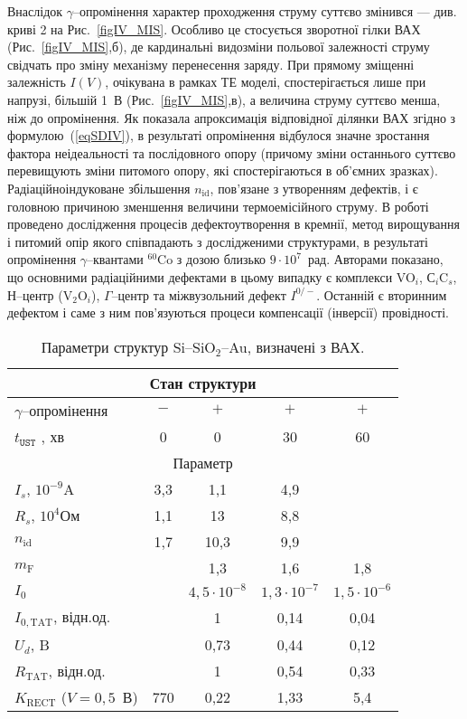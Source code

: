 Внаслідок $\gamma$--опромінення характер проходження струму суттєво змінився --- див. криві 2 на Рис.~\ref{figIV_MIS}.
Особливо це стосується зворотної гілки ВАХ (Рис.~\ref{figIV_MIS},б), де кардинальні видозміни польової залежності струму свідчать про зміну механізму перенесення заряду.
При прямому зміщенні залежність $I(V)$, очікувана в рамках ТЕ моделі, спостерігається лише при напрузі, більшій 1~В (Рис.~\ref{figIV_MIS},в), а величина струму суттєво менша, ніж до опромінення.
Як показала апроксимація відповідної ділянки ВАХ згідно з формулою~(\ref{eqSDIV}), в результаті опромінення відбулося значне  зростання фактора неідеальності та послідовного опору (причому зміни останнього суттєво перевищують зміни питомого опору, які спостерігаються в об'ємних зразках).
Радіаційноіндуковане збільшення $n_\mathrm{id}$, пов'язане з утворенням дефектів, і є головною причиною зменшення величини термоемісійного струму.
В роботі \cite{FZSi:Rad} проведено дослідження процесів дефектоутворення в кремнії, метод вирощування і питомий опір якого співпадають з дослідженими структурами, в результаті опромінення $\gamma$--квантами $^{60}$Co з дозою близько $9\cdot10^7$~рад.
Авторами  показано, що основними радіаційними дефектами в цьому випадку є комплекси VO$_i$, С$_i$C$_s$, $Н$--центр (V$_2$O$_i$), $\Gamma$--центр та міжвузольний дефект $I^{0/-}$.
Останній є вторинним дефектом і саме з ним пов'язуються процеси компенсації (інверсії) провідності.


\begin{table}
\caption{\label{tabMIS}Параметри структур Si--SiO$_2$--Au, визначені з ВАХ.
}
\center
\begin{tabular}{|l|c|c|c|c|}
\hline
\multicolumn{5}{|c|}{Стан структури}\\\hline
$\gamma$--опромінення&$-$&$+$&$+$&$+$\\ \hline
$t_\mathtt{UST}$ , хв&0&0&30&60\\ \hline
\multicolumn{5}{|c|}{Параметр}\\\hline
$I_s$, $10^{-9}$A & 3,3& 1,1& 4,9& \\ \hline
$R_s$, $10^{4}$Ом & 1,1& 13& 8,8& \\ \hline
$n_\mathrm{id}$ & 1,7& 10,3& 9,9& \\ \hline
$m_\mathrm{F}$ & &1,3& 1,6& 1,8 \\ \hline
$I_0$ & &$4,5\cdot10^{-8}$& $1,3\cdot10^{-7}$& $1,5\cdot10^{-6}$ \\ \hline
$I_{0,\mathrm{TAT}}$, відн.од. & &1& 0,14& 0,04 \\ \hline
$U_d$, B & &0,73& 0,44& 0,12 \\ \hline
$R_\mathrm{TAT}$, відн.од. & &1& 0,54& 0,33 \\ \hline
$K_\mathrm{RECT}$ ($V=0,5$~В)&770 &0,22& 1,33& 5,4 \\ \hline
\end{tabular}
\end{table}


